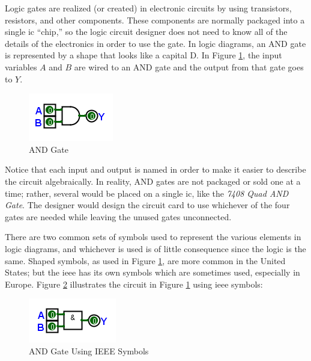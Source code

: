 Logic gates are realized (or created) in electronic circuits by using transistors, resistors, and other components. These components are normally packaged into a single \gls{ic} ``chip,'' so the logic circuit designer does not need to know all of the details of the electronics in order to use the gate. In logic diagrams, an \textsf{AND}  gate is represented by a shape that looks like a capital \textsf{D}. In Figure \ref{fig:04_01}, the input variables $ A $ and $ B $ are wired to an \textsf{AND}  gate and the output from that gate goes to $ Y $.

\begin{figure}[H]
	\centering
	\includegraphics[width=\maxwidth{.95\linewidth}]{gfx/04_01}
	\caption{AND Gate}
	\label{fig:04_01}
\end{figure}

Notice that each input and output is named in order to make it easier to describe the circuit algebraically. In reality, \textsf{AND}  gates are not packaged or sold one at a time; rather, several would be placed on a single \gls{ic}, like the \emph{7408 Quad AND Gate}. The designer would design the circuit card to use whichever of the four gates are needed while leaving the unused gates unconnected. 

There are two common sets of symbols used to represent the various elements in logic diagrams, and whichever is used is of little consequence since the logic is the same. Shaped symbols, as used in Figure \ref{fig:04_01}, are more common in the United States; but the \gls{ieee} has its own symbols which are sometimes used, especially in Europe. Figure \ref{fig:04_02} illustrates the circuit in Figure \ref{fig:04_01} using \gls{ieee} symbols:


\begin{figure}[H]
	\centering
	\includegraphics[width=\maxwidth{.95\linewidth}]{gfx/04_02}
	\caption{AND Gate Using IEEE Symbols}
	\label{fig:04_02}
\end{figure}

